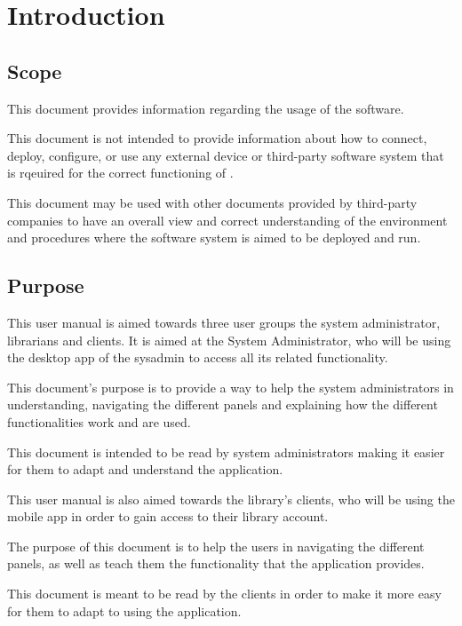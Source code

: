 \chapter{Introduction}
\label{chap:introduction}

\section{Scope}

This document provides information regarding the usage of the \mysystemname
software.
 
This document is not intended to provide information about how to
 connect, deploy, configure, or use any external device or
 third-party software system that is rqeuired for the correct functioning of
 \mysystemname.

This document may be used with other documents provided by third-party
 companies to have an overall view and correct understanding of the environment
 and procedures where the software system \mysystemname is aimed to be deployed
 and run.


\section{Purpose}

This user manual is aimed towards three user groups the system administrator,
librarians and clients. It is aimed at the System Administrator, who will be using the desktop app of the sysadmin to access all its related functionality. 

This document's purpose is to provide a way to help the system administrators in
understanding, navigating the different panels and explaining how the different functionalities work and are used. 

This document is intended to be read by system administrators making it easier
for them to adapt and understand the application.

This user manual is also aimed towards the library's clients, who will be using
the mobile app in order to gain access to their library account.

The purpose of this document is to help the users in navigating the different
panels, as well as teach them the functionality that the application provides.

This document is meant to be read by the clients in order to make it more easy
for them to adapt to using the application.





